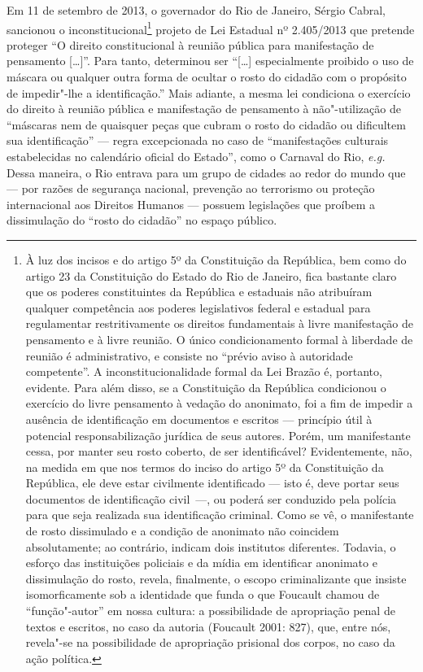Em 11 de setembro de 2013, o governador do Rio de Janeiro, Sérgio
Cabral, sancionou o inconstitucional\footnote{À luz dos
  incisos  e  do artigo 5º da Constituição da República, bem como
  do artigo 23 da Constituição do Estado do Rio de Janeiro, fica
  bastante claro que os poderes constituintes da República e estaduais
  não atribuíram qualquer competência aos poderes legislativos federal e
  estadual para regulamentar restritivamente os direitos fundamentais à
  livre manifestação de pensamento e à livre reunião. O único
  condicionamento formal à liberdade de reunião é administrativo, e
  consiste no ``prévio aviso à autoridade competente''. A
  inconstitucionalidade formal da Lei Brazão é, portanto, evidente. Para
  além disso, se a Constituição da República condicionou o exercício do
  livre pensamento à vedação do anonimato, foi a fim de impedir a
  ausência de identificação em documentos e escritos --- princípio útil à
  potencial responsabilização jurídica de seus autores. Porém, um
  manifestante cessa, por manter seu rosto coberto, de ser
  identificável? Evidentemente, não, na medida em que nos termos do
  inciso  do artigo 5º da Constituição da República, ele deve estar
  civilmente identificado --- isto é, deve portar seus documentos de
  identificação civil~---, ou poderá ser conduzido pela polícia para que
  seja realizada sua identificação criminal. Como se vê, o manifestante
  de rosto dissimulado e a condição de anonimato não coincidem
  absolutamente; ao contrário, indicam dois institutos diferentes.
  Todavia, o esforço das instituições policiais e da mídia em
  identificar anonimato e dissimulação do rosto, revela, finalmente, o
  escopo criminalizante que insiste isomorficamente sob a identidade que
  funda o que Foucault chamou de ``função"-autor'' em nossa cultura: a
  possibilidade de apropriação penal de textos e escritos, no caso da
  autoria (Foucault 2001: 827), que, entre nós, revela"-se na
  possibilidade de apropriação prisional dos corpos, no caso da ação
  política.} projeto de Lei Estadual nº 2.405/2013 que pretende
proteger ``O direito constitucional à reunião pública para manifestação
de pensamento {[}\ldots{}{]}''. Para tanto, determinou ser ``{[}\ldots{}{]}
especialmente proibido o uso de máscara ou qualquer outra forma de
ocultar o rosto do cidadão com o propósito de impedir"-lhe a
identificação.'' Mais adiante, a mesma lei condiciona o exercício do
direito à reunião pública e manifestação de pensamento à não"-utilização
de ``máscaras nem de quaisquer peças que cubram o rosto do cidadão ou
dificultem sua identificação'' --- regra excepcionada no caso de
``manifestações culturais estabelecidas no calendário oficial do
Estado'', como o Carnaval do Rio, \emph{e.g.} Dessa maneira, o Rio
entrava para um grupo de cidades ao redor do mundo que --- por razões de
segurança nacional, prevenção ao terrorismo ou proteção internacional
aos Direitos Humanos --- possuem legislações que proíbem a dissimulação
do ``rosto do cidadão'' no espaço público.

